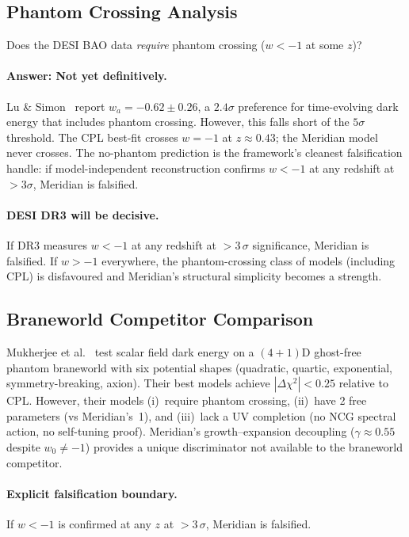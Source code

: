 \subsection{Phantom Crossing Analysis}
\label{sec:2-DESI-phantom}

Does the DESI BAO data \emph{require} phantom crossing ($w < -1$ at some $z$)?

\paragraph{Answer: Not yet definitively.} Lu \& Simon~\cite{ch2:LuSimon2026} report $w_a = -0.62 \pm 0.26$, a $2.4\sigma$ preference for time-evolving dark energy that includes phantom crossing. However, this falls short of the $5\sigma$ threshold. The CPL best-fit crosses $w = -1$ at $z \approx 0.43$; the Meridian model never crosses. The no-phantom prediction is the framework's cleanest falsification handle: if model-independent reconstruction confirms $w < -1$ at any redshift at $> 3\sigma$, Meridian is falsified.

\paragraph{DESI DR3 will be decisive.} If DR3 measures $w < -1$ at any redshift at $> 3\,\sigma$ significance, Meridian is falsified. If $w > -1$ everywhere, the phantom-crossing class of models (including CPL) is disfavoured and Meridian's structural simplicity becomes a strength.

\subsection{Braneworld Competitor Comparison}
\label{sec:2-DESI-braneworld}

Mukherjee et al.~\cite{ch2:mukherjee25} test scalar field dark energy on a $(4{+}1)$D ghost-free phantom braneworld with six potential shapes (quadratic, quartic, exponential, symmetry-breaking, axion). Their best models achieve $|\Delta\chi^2| < 0.25$ relative to CPL. However, their models (i)~require phantom crossing, (ii)~have 2 free parameters (vs Meridian's~1), and (iii)~lack a UV completion (no NCG spectral action, no self-tuning proof). Meridian's growth--expansion decoupling ($\gamma \approx 0.55$ despite $w_0 \neq -1$) provides a unique discriminator not available to the braneworld competitor.

\paragraph{Explicit falsification boundary.}
If $w < -1$ is confirmed at any $z$ at $> 3\,\sigma$, Meridian is falsified.

